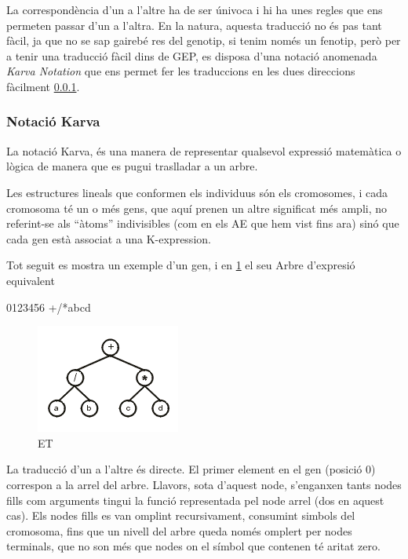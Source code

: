 \documentclass[titlepage,a4paper,12pt]{book}
\begin{document}
La correspondència d'un a l'altre ha de ser únivoca i hi ha unes regles que ens
permeten passar d'un a l'altra.  En la natura, aquesta traducció no és pas tant
fàcil, ja que no se sap gairebé res del genotip, si tenim només un fenotip, però
per a tenir una traducció fàcil dins de GEP, es disposa d'una notació anomenada
\emph{Karva Notation} que ens permet fer les traduccions en les dues direccions
fàcilment \ref{ssub:Notacio Karva}.



\subsubsection{Notació Karva} %
\label{ssub:Notacio Karva}

La notació Karva, és una manera de representar qualsevol expressió matemàtica o
lògica de manera que es pugui traslladar a un arbre.\cite{ferreira:2001}

Les estructures lineals que conformen els individuus són els cromosomes, i cada
cromosoma té un o més gens, que aquí prenen un altre significat més ampli, no
referint-se als ``àtoms'' indivisibles (com en els AE que hem vist fins ara)
sinó que cada gen està associat a una K-expression. \cite{ferreira:2007}

Tot seguit es mostra un exemple d'un gen, i en \ref{fig:expression tree1} el seu Arbre d'expresió equivalent

\begin{center}
0123456    
+/*abcd
\end{center}

\begin{figure}[h]
\begin{center}
\includegraphics{intro/et1.png}
\end{center}
\caption{ET}
\label{fig:expression tree1}
\end{figure}

La traducció d'un a l'altre és directe.  El primer element en el gen (posició
0) correspon a la arrel del arbre.  Llavors, sota d'aquest node, s'enganxen
tants nodes fills com arguments tingui la funció representada pel node arrel
(dos en aquest cas). Els nodes fills es van omplint recursivament, consumint
simbols del cromosoma, fins que un nivell del arbre queda només omplert per
nodes terminals, que no son més que nodes on el símbol que contenen té aritat
zero.
\end{document}
